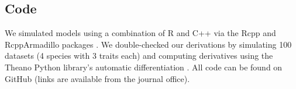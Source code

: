 \subsection*{Code}

We simulated models using a combination of R \citep{RCoreTeam:2019wf} and
C++ via the Rcpp and RcppArmadillo packages
\citep{Eddelbuettel:2014ad,Eddelbuettel:2013if,Sanderson:2016cs}.
We double-checked our derivations by simulating 100 datasets
(4 species with 3 traits each) and computing derivatives using the Theano Python
library's automatic differentiation \citep{TheanoDevelopmentTeam:2016uc}.
All code can be found on GitHub
(links are available from the journal office).

